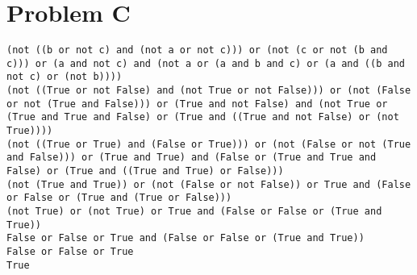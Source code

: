 \documentclass{article}
\begin{document}
\section*{Problem C}
\begin{verbatim}
(not ((b or not c) and (not a or not c))) or (not (c or not (b and c))) or (a and not c) and (not a or (a and b and c) or (a and ((b and not c) or (not b))))
(not ((True or not False) and (not True or not False))) or (not (False or not (True and False))) or (True and not False) and (not True or (True and True and False) or (True and ((True and not False) or (not True))))
(not ((True or True) and (False or True))) or (not (False or not (True and False))) or (True and True) and (False or (True and True and False) or (True and ((True and True) or False)))
(not (True and True)) or (not (False or not False)) or True and (False or False or (True and (True or False)))
(not True) or (not True) or True and (False or False or (True and True))
False or False or True and (False or False or (True and True))
False or False or True
True
\end{verbatim}
\end{document}
